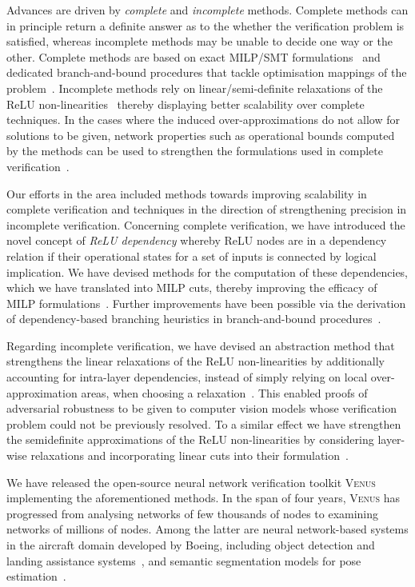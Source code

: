 \documentclass{article}
\newcommand{\venus}{\textsc{Venus}\xspace}
\begin{document}
Advances are driven by {\em complete} and {\em incomplete} methods.  Complete
methods can in principle return a definite answer as to the whether the
verification problem is satisfied, whereas incomplete methods may be unable to
decide one way or the other. Complete methods are based on exact MILP/SMT 
formulations~\cite{Bastani+16,Katz+17} and dedicated branch-and-bound procedures
that tackle optimisation mappings of the problem~\cite{Bunel+18}.  Incomplete
methods rely on linear/semi-definite relaxations of the  ReLU
non-linearities~\cite{WongKolter17,RaghunathanSteinhardtLiang18} thereby
displaying better scalability over complete techniques. In the cases where the
induced over-approximations  do not allow for solutions to be given, network
properties such as operational bounds computed by the methods can be used to
strengthen the formulations used in complete verification~\cite{Botoeva+20}.


Our efforts in the area included methods towards improving scalability in
complete verification and techniques in the direction of strengthening precision
in incomplete verification. Concerning complete verification, we have introduced the
novel concept of {\em ReLU dependency} whereby ReLU nodes are in a dependency
relation if their operational states for a set of inputs is connected by logical
implication.  We have devised methods for the computation of these dependencies,
which we  have translated into MILP cuts, thereby improving the efficacy of MILP
formulations~\cite{Botoeva+20}.  Further improvements have been possible via the
derivation of dependency-based branching heuristics  in branch-and-bound
procedures~\cite{KouvarosLomuscio21}.


Regarding incomplete verification, we have devised an abstraction method that
strengthens the linear relaxations of the ReLU non-linearities by additionally
accounting for intra-layer dependencies, instead of simply relying on local
over-approximation areas, when choosing a
relaxation~\cite{HashemiKouvarosLomuscio21}. This enabled proofs of adversarial
robustness to be given to computer vision models whose verification problem
could not be previously resolved. To a similar effect we have strengthen the
semidefinite approximations of the ReLU non-linearities by considering
layer-wise relaxations and incorporating linear cuts into their 
formulation~\cite{Batten+21}.

We have released the open-source neural network verification toolkit \venus
implementing the aforementioned methods.  In the span of four years, \venus has
progressed from analysing networks of few thousands of nodes to examining
networks of millions of nodes. Among the latter are neural network-based systems
in the aircraft domain developed by Boeing, including object detection and
landing assistance systems~\cite{Kouvaros+21}, and semantic segmentation models
for pose estimation~\cite{Kouvaros+23}.
\end{document}
